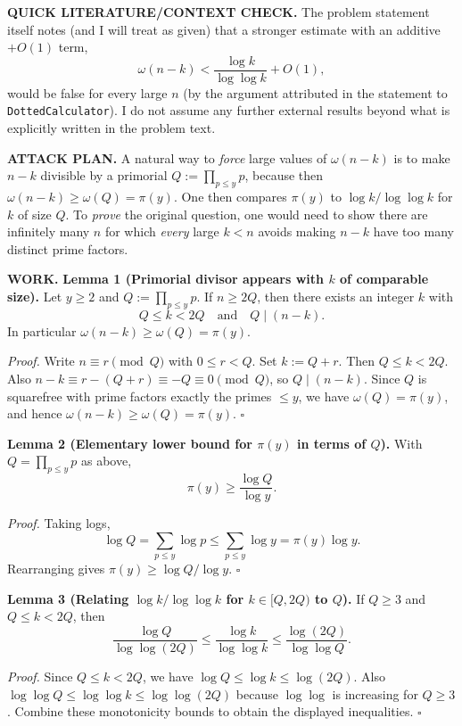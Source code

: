 \textbf{QUICK LITERATURE/CONTEXT CHECK.}
The problem statement itself notes (and I will treat as given) that a stronger estimate with an additive $+O(1)$ term,
\[\omega(n-k) < \frac{\log k}{\log\log k} + O(1),\]
would be false for every large $n$ (by the argument attributed in the statement to \texttt{DottedCalculator}). I do not assume any further external results beyond what is explicitly written in the problem text.

\textbf{ATTACK PLAN.}
A natural way to \emph{force} large values of $\omega(n-k)$ is to make $n-k$ divisible by a primorial $Q:=\prod_{p\le y}p$, because then $\omega(n-k)\ge\omega(Q)=\pi(y)$. One then compares $\pi(y)$ to $\log k/\log\log k$ for $k$ of size $Q$.
To \emph{prove} the original question, one would need to show there are infinitely many $n$ for which \emph{every} large $k<n$ avoids making $n-k$ have too many distinct prime factors.

\textbf{WORK.}
\textbf{Lemma 1 (Primorial divisor appears with $k$ of comparable size).}
Let $y\ge2$ and $Q:=\prod_{p\le y}p$. If $n\ge 2Q$, then there exists an integer $k$ with
\[Q\le k <2Q\quad\text{and}\quad Q\mid (n-k).
\]
In particular $\omega(n-k)\ge \omega(Q)=\pi(y)$.

\emph{Proof.}
Write $n\equiv r\pmod Q$ with $0\le r<Q$.
Set $k:=Q+r$. Then $Q\le k<2Q$.
Also $n-k\equiv r-(Q+r)\equiv -Q\equiv 0\pmod Q$, so $Q\mid(n-k)$.
Since $Q$ is squarefree with prime factors exactly the primes $\le y$, we have $\omega(Q)=\pi(y)$, and hence $\omega(n-k)\ge\omega(Q)=\pi(y)$.
\hfill$\square$

\textbf{Lemma 2 (Elementary lower bound for $\pi(y)$ in terms of $Q$).}
With $Q=\prod_{p\le y}p$ as above,
\[\pi(y)\ge \frac{\log Q}{\log y}.
\]

\emph{Proof.}
Taking logs,
\[\log Q=\sum_{p\le y}\log p\le \sum_{p\le y}\log y=\pi(y)\log y.
\]
Rearranging gives $\pi(y)\ge \log Q/\log y$.
\hfill$\square$

\textbf{Lemma 3 (Relating $\log k/\log\log k$ for $k\in[Q,2Q)$ to $Q$).}
If $Q\ge 3$ and $Q\le k<2Q$, then
\[
\frac{\log Q}{\log\log(2Q)}\le \frac{\log k}{\log\log k}\le \frac{\log(2Q)}{\log\log Q}.
\]

\emph{Proof.}
Since $Q\le k<2Q$, we have $\log Q\le \log k\le \log(2Q)$.
Also $\log\log Q\le \log\log k\le \log\log(2Q)$ because $\log\log$ is increasing for $Q\ge 3$.
Combine these monotonicity bounds to obtain the displayed inequalities.
\hfill$\square$

